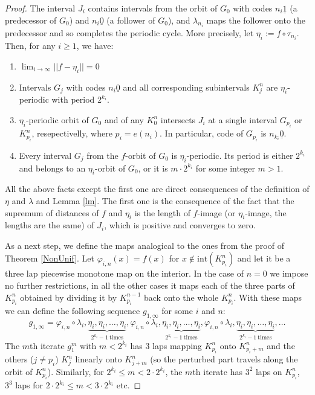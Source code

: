 \documentclass{amsart}
\begin{document}
\begin{proof}
The interval $J_i$ contains intervals from the orbit of $G_0$ with codes $n_i\underline{1}$ (a predecessor of $G_0$) and $n_i\underline{0}$ (a follower of $G_0$), and $\lambda_{n_i}$ maps the follower onto the predecessor and so completes the periodic cycle. More precisely, let $\eta_i := f \circ \tau_{n_i}$. Then, for any $i \geq 1$, we have:
\begin{enumerate}
\item $\lim_{i\rightarrow\infty}||f-\eta_i|| = 0$
\item Intervals $G_j$ with codes $n_i\underline{0}$ and all corresponding subintervals $K^n_j$ are $\eta_i$-periodic with period $2^{k_i}$.
\item $\eta_i$-periodic orbit of $G_0$ and of any $K^n_0$ intersects $J_i$ at a single interval $G_{p_i}$ or $K^n_{p_i}$, resepectivelly, where $p_i = e(n_i)$. In particular, code of $G_{p_i}$ is $n_{k_i}\underline{0}$.
\item Every interval $G_j$ from the $f$-orbit of $G_0$ is $\eta_i$-periodic. Its period is either $2^{k_i}$ and belongs to an $\eta_i$-orbit of $G_0$, or it is $m\cdot 2^{k_i}$ for some integer $m>1$.
\end{enumerate}

All the above facts except the first one are direct consequences of the definition of $\eta$ and $\lambda$ and Lemma \ref{lm}. The first one is the consequence of the fact that the supremum of distances of $f$ and $\eta_i$ is the length of $f$-image (or $\eta_i$-image, the lengths are the same) of $J_i$, which is positive and converges to zero.

As a next step, we define the maps analogical to the ones from the proof of Theorem \ref{NonUnif}. Let $\varphi_{i,n}(x)=f(x)$ for $x\not\in\mbox{int}(K^n_{p_i})$ and let it be a three lap piecewise monotone map on the interior. In the case of $n=0$ we impose no further restrictions, in all the other cases it maps each of the three parts of $K^n_{p_i}$ obtained by dividing it by $K^{n-1}_{p_i}$ back onto the whole $K^n_{p_i}$. With these maps we can define the following sequence $g_{1,\infty}$ for some $i$ and $n$: $$g_{1,\infty} = \varphi_{i,n}\circ\lambda_i,\underbrace{\eta_i,\eta_i,\ldots,\eta_i}_{2^{k_i}-1\ \mbox{times}},\varphi_{i,n}\circ\lambda_i,\underbrace{\eta_i,\eta_i,\ldots,\eta_i}_{2^{k_i}-1\ \mbox{times}},\varphi_{i,n}\circ\lambda_i,\underbrace{\eta_i,\eta_i,\ldots,\eta_i}_{2^{k_i}-1\ \mbox{times}},\ldots$$
The $m$th iterate $g_1^m$ with $m < 2^{k_i}$ has 3 laps mapping $K^n_{p_i}$ onto $K^n_{p_i+m}$ and the others ($j\neq p_i$) $K^n_j$ linearly onto $K^n_{j+m}$ (so the perturbed part travels along the orbit of $K^n_{p_i}$). Similarly, for $2^{k_i} \leq m < 2\cdot2^{k_i}$, the $m$th iterate has $3^2$ laps on $K^n_{p_i}$, $3^3$ laps for $2\cdot2^{k_i} \leq m < 3\cdot2^{k_i}$ etc.


\end{proof}
\end{document}
